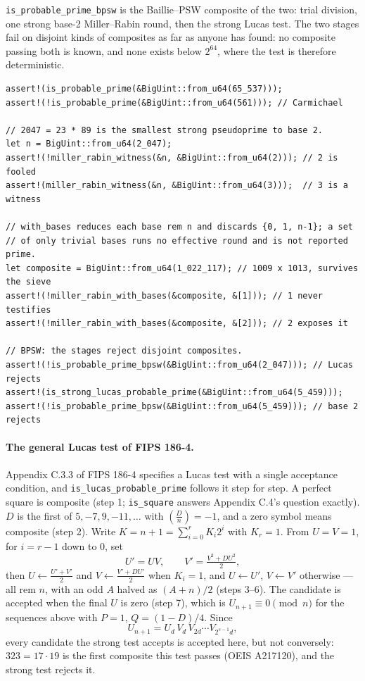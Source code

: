 \documentclass[11pt]{article}
\newcommand{\code}[1]{\texttt{#1}}
\newcommand{\jac}[2]{\left(\frac{#1}{#2}\right)}
\begin{document}
\code{is\_probable\_prime\_bpsw} is the Baillie--PSW composite of the two:
trial division, one strong base-2 Miller--Rabin round, then the strong
Lucas test. The two stages fail on disjoint kinds of composites as far as
anyone has found: no composite passing both is known, and none exists
below $2^{64}$, where the test is therefore deterministic.

\begin{lstlisting}
assert!(is_probable_prime(&BigUint::from_u64(65_537)));
assert!(!is_probable_prime(&BigUint::from_u64(561))); // Carmichael

// 2047 = 23 * 89 is the smallest strong pseudoprime to base 2.
let n = BigUint::from_u64(2_047);
assert!(!miller_rabin_witness(&n, &BigUint::from_u64(2))); // 2 is fooled
assert!(miller_rabin_witness(&n, &BigUint::from_u64(3)));  // 3 is a witness

// with_bases reduces each base rem n and discards {0, 1, n-1}; a set
// of only trivial bases runs no effective round and is not reported prime.
let composite = BigUint::from_u64(1_022_117); // 1009 x 1013, survives the sieve
assert!(!miller_rabin_with_bases(&composite, &[1])); // 1 never testifies
assert!(!miller_rabin_with_bases(&composite, &[2])); // 2 exposes it

// BPSW: the stages reject disjoint composites.
assert!(!is_probable_prime_bpsw(&BigUint::from_u64(2_047))); // Lucas rejects
assert!(is_strong_lucas_probable_prime(&BigUint::from_u64(5_459)));
assert!(!is_probable_prime_bpsw(&BigUint::from_u64(5_459))); // base 2 rejects
\end{lstlisting}

\paragraph{The general Lucas test of FIPS 186-4.} Appendix C.3.3 of FIPS
186-4 specifies a Lucas test with a single acceptance condition, and
\code{is\_lucas\_probable\_prime} follows it step for step. A perfect
square is composite (step 1; \code{is\_square} answers Appendix C.4's
question exactly). $D$ is the first of $5, -7, 9, -11, \ldots$ with
$\jac{D}{n} = -1$, and a zero symbol means composite (step 2). Write
$K = n + 1 = \sum_{i=0}^{r} K_i 2^i$ with $K_r = 1$. From $U = V = 1$, for
$i = r - 1$ down to $0$, set
\begin{equation}
U' = U V,
\qquad
V' = \tfrac{V^2 + D U^2}{2},
\end{equation}
then $U \leftarrow \tfrac{U' + V'}{2}$ and $V \leftarrow \tfrac{V' + D U'}{2}$
when $K_i = 1$, and $U \leftarrow U'$, $V \leftarrow V'$ otherwise --- all
rem $n$, with an odd $A$ halved as $(A + n)/2$ (steps 3--6). The candidate
is accepted when the final $U$ is zero (step 7), which is
$U_{n+1} \equiv 0 \pmod{n}$ for the sequences above with $P = 1$,
$Q = (1 - D)/4$. Since
\begin{equation}
U_{n+1} = U_d\, V_d\, V_{2d} \cdots V_{2^{s-1} d},
\end{equation}
every candidate the strong test accepts is accepted here, but not
conversely: $323 = 17 \cdot 19$ is the first composite this test passes
(OEIS A217120), and the strong test rejects it.
\end{document}
